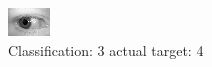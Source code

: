 \begin{figure}[h!]
\begin{center}
\includegraphics[width=0.60\columnwidth]{figures/ID757_class_3_target_4.png}
\end{center}
\caption{ Classification: 3 actual target: 4}
\label{fig:ID757_class_3_target_4}
\end{figure}
